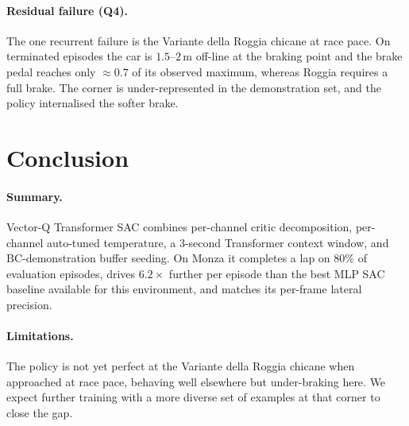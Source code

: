 \documentclass{article}
\begin{document}
\paragraph{Residual failure (Q4).}
The one recurrent failure is the Variante della Roggia chicane at
race pace. On terminated episodes the car is $1.5$--$2$\,m off-line
at the braking point and the brake pedal reaches only $\approx 0.7$
of its observed maximum, whereas Roggia requires a full brake. The
corner is under-represented in the demonstration set, and the policy
internalised the softer brake.

\FloatBarrier
\section{Conclusion}
\label{sec:conclusion}

\paragraph{Summary.}
Vector-Q Transformer SAC combines per-channel critic decomposition,
per-channel auto-tuned temperature, a $3$-second Transformer context
window, and BC-demonstration buffer seeding. On Monza it completes a
lap on $80\%$ of evaluation episodes, drives $6.2\times$ further
per episode than the best MLP SAC baseline
available for this environment, and matches its per-frame lateral
precision.

\paragraph{Limitations.}
The policy is not yet perfect at the Variante della Roggia chicane
when approached at race pace, behaving well elsewhere but
under-braking here. We expect further training with a more diverse
set of examples at that corner to close the gap.
\end{document}
